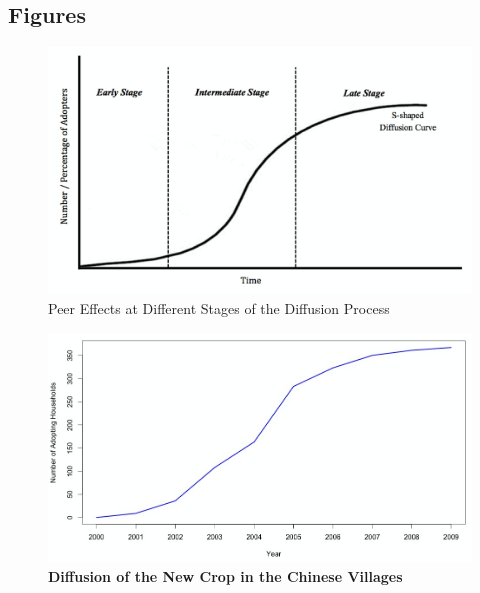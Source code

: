 \documentclass{bmcart}
\begin{document}
\begin{backmatter}


\iffalse
\section*{Figures}
\begin{figure}[h!]
\centering
\includegraphics[scale=0.15]{peer_effects_and_diffusion_curve.jpg}
\caption{Peer Effects at Different Stages of the Diffusion Process}
\label{Fig: peer effects diffusion curve}
\end{figure}

\begin{figure}[h!]
\centering
\includegraphics[scale=0.35]{Diffusion_curve_AS.jpg}
\caption{\textbf{Diffusion of the New Crop in the Chinese Villages}}
\label{Fig: diffusion curve AS}
\end{figure}


\end{backmatter}
\end{document}
